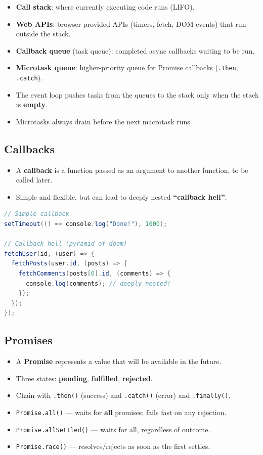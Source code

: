 \documentclass[hidelinks]{article}
\begin{document}
\begin{itemize}
  \item \textbf{Call stack}: where currently executing code runs (LIFO).
  \item \textbf{Web APIs}: browser-provided APIs (timers, fetch, DOM events) that run outside the stack.
  \item \textbf{Callback queue} (task queue): completed async callbacks waiting to be run.
  \item \textbf{Microtask queue}: higher-priority queue for Promise callbacks (\texttt{.then}, \texttt{.catch}).
  \item The event loop pushes tasks from the queues to the stack only when the stack is \textbf{empty}.
  \item Microtasks always drain before the next macrotask runs.
\end{itemize}

\subsection{Callbacks}
\begin{itemize}
  \item A \textbf{callback} is a function passed as an argument to another function, to be called later.
  \item Simple and flexible, but can lead to deeply nested \textbf{``callback hell''}.
\end{itemize}

\begin{lstlisting}[language=Java, caption={Callback example and callback hell}]
// Simple callback
setTimeout(() => console.log("Done!"), 1000);

// Callback hell (pyramid of doom)
fetchUser(id, (user) => {
  fetchPosts(user.id, (posts) => {
    fetchComments(posts[0].id, (comments) => {
      console.log(comments); // deeply nested!
    });
  });
});
\end{lstlisting}

\subsection{Promises}
\begin{itemize}
  \item A \textbf{Promise} represents a value that will be available in the future.
  \item Three states: \textbf{pending}, \textbf{fulfilled}, \textbf{rejected}.
  \item Chain with \texttt{.then()} (success) and \texttt{.catch()} (error) and \texttt{.finally()}.
  \item \texttt{Promise.all()} --- waits for \textbf{all} promises; fails fast on any rejection.
  \item \texttt{Promise.allSettled()} --- waits for all, regardless of outcome.
  \item \texttt{Promise.race()} --- resolves/rejects as soon as the first settles.
\end{itemize}
\end{document}
